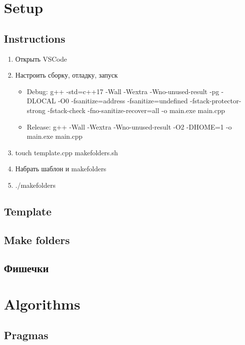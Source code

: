 \documentclass[10pt]{article}
\begin{document}
\pagestyle{fancy}

\begin{multicols}{2}

\tableofcontents

\section{Setup}
\subsection{Instructions}
\begin{enumerate}
  \item Открыть VSCode
  \item Настроить сборку, отладку, запуск
  \begin{itemize}
    \item Debug: g++ -std=c++17 -Wall 
    -Wextra -Wno-unused-result -pg 
    -DLOCAL -O0 -fsanitize=address 
    -fsanitize=undefined 
    -fstack-protector-strong -fstack-check 
    -fno-sanitize-recover=all -o main.exe main.cpp
    \item Release: g++ -Wall -Wextra 
    -Wno-unused-result -O2 -DHOME=1 -o main.exe main.cpp
  \end{itemize}  
  \item touch template.cpp makefolders.sh
  \item Набрать шаблон и makefolders
  \item ./makefolders
\end{enumerate}
\subsection{Template}

\subsection{Make folders}

\subsection{Фишечки}

\section{Algorithms}
\subsection{Pragmas}


\end{multicols}
\end{document}

